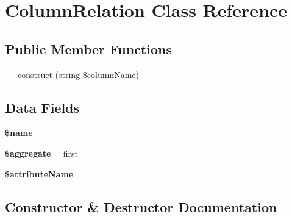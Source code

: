 \hypertarget{classhamburgscleanest_1_1_data_tables_1_1_models_1_1_column_1_1_column_relation}{}\section{Column\+Relation Class Reference}
\label{classhamburgscleanest_1_1_data_tables_1_1_models_1_1_column_1_1_column_relation}
\subsection*{Public Member Functions}
\begin{DoxyCompactItemize}
\item 
\hyperlink{classhamburgscleanest_1_1_data_tables_1_1_models_1_1_column_1_1_column_relation_a32982fa61bdbcb31c04986b55a015422}{\+\_\+\+\_\+construct} (string \$column\+Name)
\end{DoxyCompactItemize}
\subsection*{Data Fields}
\begin{DoxyCompactItemize}
\item 
\mbox{\label{classhamburgscleanest_1_1_data_tables_1_1_models_1_1_column_1_1_column_relation_ab2fc40d43824ea3e1ce5d86dee0d763b}} 
{\bfseries \$name}
\item 
\mbox{\label{classhamburgscleanest_1_1_data_tables_1_1_models_1_1_column_1_1_column_relation_a64886274e81c8152b822038ab683dbe1}} 
{\bfseries \$aggregate} = \textquotesingle{}first\textquotesingle{}
\item 
\mbox{\label{classhamburgscleanest_1_1_data_tables_1_1_models_1_1_column_1_1_column_relation_a257bb27c360747a7f80b842e7109f54c}} 
{\bfseries \$attribute\+Name}
\end{DoxyCompactItemize}


\subsection{Constructor \& Destructor Documentation}
\mbox{\label{classhamburgscleanest_1_1_data_tables_1_1_models_1_1_column_1_1_column_relation_a32982fa61bdbcb31c04986b55a015422}} 
